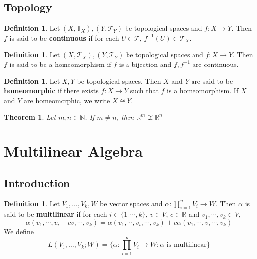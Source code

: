 \documentclass[12pt]{amsart}
\newtheorem{thm}{Theorem}[subsection]
\theoremstyle{definition}
\newtheorem{defn}[definition]{Definition}
\theoremstyle{remark}
\theoremstyle{definition}
\newcommand{\al}{\alpha}
\newcommand{\N}{\mathbb{N}}
\newcommand{\R}{\mathbb{R}}
\newcommand{\T}{\mathbb{T}}
\newcommand{\MT}{\mathcal{T}}
\begin{document}
\subsection{Topology}

\begin{defn}
Let $(X, \T_X), (Y, \MT_Y)$ be topological spaces and $f:X\rightarrow Y$. Then $f$ is said to be \textbf{continuous} if for each $U \in \MT$, $f^{-1}(U) \in \MT_X$.
\end{defn}

\begin{defn}
Let $(X, \MT_X), (Y, \MT_Y)$ be topological spaces and $f:X\rightarrow Y$. Then $f$ is said to be a homeomorphism if $f$ is a bijection and $f, f^{-1}$ are continuous. 
\end{defn}

\begin{defn}
Let $X, Y$ be topological spaces. Then $X$ and $Y$ are said to be \textbf{homeomorphic} if there exists $f:X \rightarrow Y$ such that $f$ is a homeomorphism. If $X$ and $Y$ are homeomorphic, we write $X \cong Y$. 
\end{defn}

\begin{thm}
Let $m,n \in \N$. If $m \neq n$, then $\R^m \not \cong \R^n$
\end{thm}






















\newpage
	\section{Multilinear Algebra}
	
	\subsection{Introduction}
	
	\begin{defn}
	Let $V_1, \dots, V_k, W$ be vector spaces and $\al : \prod_{i=1}^n V_i \rightarrow W$. Then $\al$ is said to be \textbf{multilinear} if for each $i \in \{1, \cdots, k\}$, $v \in V$, $c \in \R$ and $v_1, \cdots, v_k \in V$, $$\al(v_1, \cdots, v_i + cv, \cdots, v_k) = \al(v_1, \cdots, v_i, \cdots, v_k) + c\al(v_1, \cdots, v, \cdots, v_k)$$
	We define $$L(V_1, \dots, V_k; W) = \{\al : \prod_{i=1}^n V_i \rightarrow W: \al \text{ is multilinear}\}$$ 
	\end{defn}
	
\end{document}
